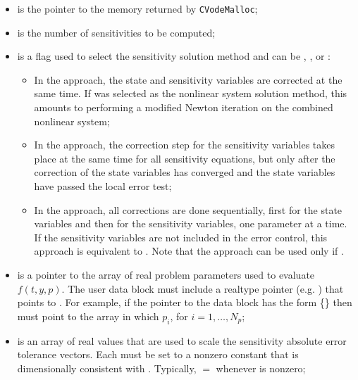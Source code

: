 \begin{itemize}
  
\item {} 
  is the pointer to the {\cvodes} memory returned by {\tt CVodeMalloc};
  
\item {} 
  is the number of sensitivities to be computed;
  
\item {} 
  is a flag used to select the sensitivity solution method and can 
  be , , or :
  \begin{itemize}
  \item In the  approach, the state and sensitivity variables are
    corrected at the same time. If  was selected as the nonlinear system 
    solution method, this amounts to performing a modified Newton iteration on the
    combined nonlinear system;
  \item In the  approach, the correction step for the sensitivity
    variables takes place at the same time for all sensitivity equations, but only after 
    the correction of the state variables has converged and the state variables 
    have passed the local error test; 
  \item In the  approach, all corrections are done sequentially, first
    for the state variables and then for the sensitivity variables, one parameter at
    a time. If the sensitivity variables are not included in the error control, this 
    approach is equivalent to . Note that the  approach 
    can be used only if .
  \end{itemize}
  
\item {} 
  is a pointer to the array of real problem parameters used to evaluate $f(t,y,p)$.
  The user data block  must include a realtype pointer (e.g. )
  that points to . For example, if the pointer to the data block has the 
  form \{\} 
  then  must point to the array in which 
   $p_i$, for $i=1,\ldots,N_p$;
  
\item {} 
  is an array of real values  that are used to scale the sensitivity absolute error 
  tolerance vectors. Each  must be set to a nonzero constant that is
  dimensionally consistent with .
  Typically, $=$ whenever  is nonzero;
  

\end{itemize}
